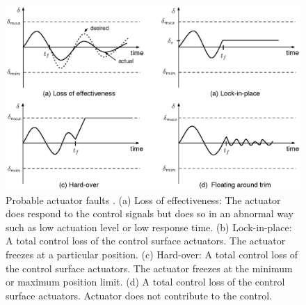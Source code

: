 \begin{figure}
\begin{center}
\includegraphics[width=14cm]{figures/actuatorFaults}    %
\caption{Probable actuator faults \cite{ducard2009fault}. (a) Loss of effectiveness: The actuator does respond to the control signals but does so in an abnormal way such as low actuation level or low response time. (b) Lock-in-place: A total control loss of the control surface actuators. The actuator freezes at a particular position. (c) Hard-over: A total control loss of the control surface actuators. The actuator freezes at the minimum or maximum position limit. (d) A total control loss of the control surface actuators. Actuator does not contribute to the control.} 
\label{fig:actuatorFaults}
\end{center}
\end{figure}








